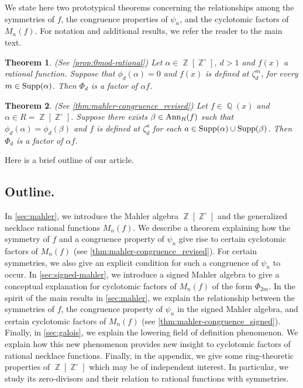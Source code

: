 \documentclass[12t,a4paper]{amsart}
\newtheorem{thm}{Theorem}[section]
\theoremstyle{definition}
\DeclareMathOperator{\Z}{\mathbb{Z}}
\DeclareMathOperator{\Q}{\mathbb{Q}}
\DeclareMathOperator{\supp}{{\rm Supp}}
\newcommand{\Ann}{{\rm Ann}}
\numberwithin{equation}{section}
\begin{document}
{We state here two prototypical theorems concerning the relationships among the symmetries of $f$, the congruence properties of $\psi_n$, and the cyclotomic factors of $M_n(f)$. For notation and additional results, we refer the reader to the main text.


\begin{thm} (See \cref{prop:0mod-rational}) \label{intro1}
    Let $\alpha\in  \Z[\Z^\circ]$, $d>1$ and $f(x)$ a rational function. Suppose that $\phi_d(\alpha)=0$ and $f(x)$ is defined at $\zeta_d^m$, for every $m \in \supp(\alpha)$. Then $\Phi_d$ is a factor of $\alpha f$.
\end{thm}


\begin{thm} (See \cref{thm:mahler-congruence_revised})
   Let $f\in \Q(x)$ and $\alpha\in R=\Z[\Z^{\circ}]$.
    Suppose there exists $\beta\in \Ann_R(f)$ such that $\phi_d(\alpha)=\phi_d(\beta)$ and $f$ is defined at $\zeta_d^a$ for each $a \in \supp(\alpha)\cup \supp(\beta)$. Then $\Phi_d$ is a factor of $\alpha f$. 
\end{thm}




Here is a brief outline of our article. 

\subsection{Outline.} 
In \cref{sec:mahler}, we introduce the Mahler algebra $\Z[\Z^{\circ}]$ and the generalized necklace rational functions $M_n(f)$. We describe a theorem explaining how the symmetry of $f$ and a congruence property of $\psi_n$ give rise to certain cyclotomic factors of $M_n(f)$ (see \cref{thm:mahler-congruence_revised}). For certain symmetries, we also give an explicit condition for such a congruence of $\psi_n$ to occur.  In \cref{sec:signed-mahler}, we introduce a signed Mahler algebra to give a conceptual explanation for cyclotomic factors of $M_n(f)$ of the form $\Phi_{2m}$. In the spirit of the main results in \cref{sec:mahler}, we explain the relationship between the symmetries of $f$, the congruence property of $\psi_n$ in the signed Mahler algebra, and certain cyclotomic factors of $M_n(f)$ (see \cref{thm:mahler-congruence_signed}). Finally, in \cref{sec:galois}, we explain the lowering field of definition phenomenon. We explain how this new phenomenon provides new insight to cyclotomic factors of rational necklace functions. Finally, in the appendix, we give some ring-theoretic properties of $\Z[\Z^{\circ}]$ which may be of independent interest. In particular, we study its zero-divisors and their relation to rational functions with symmetries.











}
\end{document}
